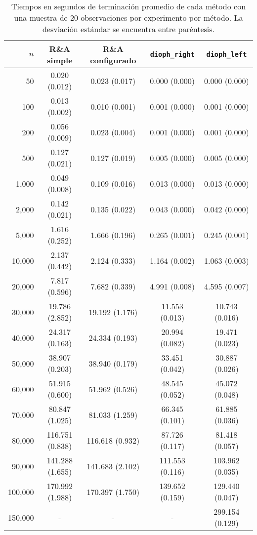 \begin{table}[h]
	\centering
	\begin{tabular}{rcccc} \toprule
		$n$ & R\&A simple & R\&A configurado & \texttt{dioph\_right} & \texttt{dioph\_left} \\ \midrule
		50     & 0.020 (0.012) & 0.023 (0.017) & 0.000 (0.000) & 0.000 (0.000)\\
		100    & 0.013 (0.002) & 0.010 (0.001) & 0.001 (0.000) & 0.001 (0.000)\\
		200    & 0.056 (0.009) & 0.023 (0.004) & 0.001 (0.000) & 0.001 (0.000)\\
		500    & 0.127 (0.021) & 0.127 (0.019) & 0.005 (0.000) & 0.005 (0.000)\\ \midrule
		1,000   & 0.049 (0.008) & 0.109 (0.016) & 0.013 (0.000) & 0.013 (0.000)\\
		2,000   & 0.142 (0.021) & 0.135 (0.022) & 0.043 (0.000) & 0.042 (0.000)\\
		5,000   & 1.616 (0.252) & 1.666 (0.196) & 0.265 (0.001) & 0.245 (0.001)\\
		10,000  & 2.137 (0.442) & 2.124 (0.333) & 1.164 (0.002) & 1.063 (0.003)\\ \midrule
		20,000  & 7.817 (0.596) & 7.682 (0.339) & 4.991 (0.008) & 4.595 (0.007)\\
		30,000  & 19.786 (2.852) & 19.192 (1.176) & 11.553 (0.013) & 10.743 (0.016)\\
		40,000  & 24.317 (0.163) & 24.334 (0.193) & 20.994 (0.082) & 19.471 (0.023)\\
		50,000  & 38.907 (0.203) & 38.940 (0.179) & 33.451 (0.042) & 30.887 (0.026)\\ \midrule
		60,000  & 51.915 (0.600) & 51.962 (0.526) & 48.545 (0.052) & 45.072 (0.048)\\
		70,000  & 80.847 (1.025) & 81.033 (1.259) & 66.345 (0.101) & 61.885 (0.036)\\
		80,000  & 116.751 (0.838) & 116.618 (0.932) & 87.726 (0.117) & 81.418 (0.057)\\
		90,000  & 141.288 (1.655) & 141.683 (2.102) & 111.553 (0.116) & 103.962 (0.035)\\ \midrule
		100,000 & 170.992 (1.988) & 170.397 (1.750) & 139.652 (0.159) & 129.440 (0.047)\\
		150,000 & - & - & - & 299.154 (0.129) \\ \bottomrule
	\end{tabular}
	\caption{Tiempos en segundos de terminación promedio de cada método con una muestra de 20
	observaciones por experimento por método. La desviación estándar se encuentra entre paréntesis.}
	\label{table:fin:mt:times}
\end{table}

